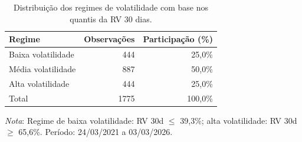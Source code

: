 \begin{table}[H]
\centering
\small
\caption{Distribuição dos regimes de volatilidade com base nos quantis da RV 30 dias.}
\label{tab:cap9_frequencia_regimes}
\begin{tabular}{lrr}
\toprule
Regime & Observações & Participação (\%) \\
\midrule
Baixa volatilidade & 444 & 25,0\% \\
Média volatilidade & 887 & 50,0\% \\
Alta volatilidade & 444 & 25,0\% \\
\midrule
Total & 1775 & 100,0\% \\
\bottomrule
\end{tabular}
\par\smallskip
\footnotesize\textit{Nota}: Regime de baixa volatilidade: RV 30d $\leq$ 39,3\%; alta volatilidade: RV 30d $\geq$ 65,6\%. Período: 24/03/2021 a 03/03/2026.
\end{table}